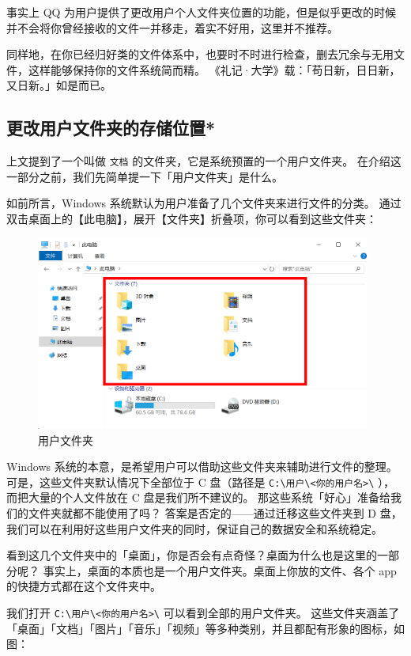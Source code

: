 事实上 QQ 为用户提供了更改用户个人文件夹位置的功能，但是似乎更改的时候并不会将你曾经接收的文件一并移走，着实不好用，这里并不推荐。

同样地，在你已经归好类的文件体系中，也要时不时进行检查，删去冗余与无用文件，这样能够保持你的文件系统简而精。
《礼记·大学》载：「苟日新，日日新，又日新。」如是而已。

\subsection{更改用户文件夹的存储位置*}

上文提到了一个叫做 \verb|文档| 的文件夹，它是系统预置的一个用户文件夹。
在介绍这一部分之前，我们先简单提一下「用户文件夹」是什么。

如前所言，Windows 系统默认为用户准备了几个文件夹来进行文件的分类。
通过双击桌面上的【此电脑】，展开【文件夹】折叠项，你可以看到这些文件夹：

\begin{figure}[htb!]
  \centering
  \includegraphics[width=11cm]{assets/User_directories.png}
  \caption{用户文件夹}
  \label{User_directories}
\end{figure}

Windows 系统的本意，是希望用户可以借助这些文件夹来辅助进行文件的整理。
可是，这些文件夹默认情况下全部位于 C 盘（路径是 \verb|C:\用户\<你的用户名>\| ），而把大量的个人文件放在 C 盘是我们所不建议的。
那这些系统「好心」准备给我们的文件夹就都不能使用了吗？
答案是否定的——通过迁移这些文件夹到 D 盘，我们可以在利用好这些用户文件夹的同时，保证自己的数据安全和系统稳定。

\begin{note}
  看到这几个文件夹中的「桌面」，你是否会有点奇怪？桌面为什么也是这里的一部分呢？
  事实上，桌面的本质也是一个用户文件夹。桌面上你放的文件、各个 app 的快捷方式都在这个文件夹中。
\end{note}

我们打开 \verb|C:\用户\<你的用户名>\| 可以看到全部的用户文件夹。
这些文件夹涵盖了「桌面」「文档」「图片」「音乐」「视频」等多种类别，并且都配有形象的图标，如图：

